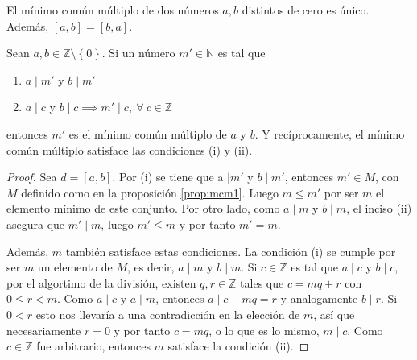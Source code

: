 \begin{remark}
El mínimo común múltiplo de dos números $a,b$ distintos de cero es único. Además, $[a,b]=[b,a]$.
\end{remark}
\begin{proposition}
Sean $a,b\in \mathbb{Z}\setminus\left\{0\right\}$. Si un número $m'\in \mathbb{N}$ es tal que 

\begin{enumerate}[label=\textnormal{(\roman*)}]
	\item $a \mid m'$ y $b \mid m'$
	\item $a \mid c$ y $b \mid c \implies m' \mid c,\:\forall \: c\in \mathbb{Z}$
\end{enumerate}
entonces $m'$ es el mínimo común múltiplo de $a$ y $b$. Y recíprocamente, el mínimo común múltiplo satisface las condiciones (i) y (ii).
\end{proposition}
\begin{proof}
Sea $d=[a,b]$. Por (i) se tiene que a $\mid m'$ y $b \mid m'$, entonces $m'\in M$, con $M$ definido como en la proposición \eqref{prop:mcm1}. Luego $m\leq m'$ por ser $m$ el elemento mínimo de este conjunto. Por otro lado, como $a \mid m$ y $b \mid m$, el inciso (ii) asegura que $m' \mid m$, luego $m'\leq m$ y por tanto $m'=m$.
\bigskip

Además, $m$ también satisface estas condiciones. La condición (i) se cumple por ser $m$ un elemento de $M$, es decir, $a \mid m$ y $b \mid m$. Si $c\in \mathbb{Z}$ es tal que $a \mid c$ y $b \mid c$, por el algortimo de la división, existen $q,r\in \mathbb{Z}$ tales que $c=mq+r$ con $0\leq r<m$. Como $a \mid c$ y $a \mid m$, entonces $a \mid c-mq=r$ y analogamente $b \mid r$. Si $0<r$ esto nos llevaría a una contradicción en la elección de $m$, así que necesariamente $r=0$ y por tanto $c=mq$, o lo que es lo mismo, $m \mid c$. Como $c\in \mathbb{Z}$ fue arbitrario, entonces $m$ satisface la condición (ii).
\end{proof}

